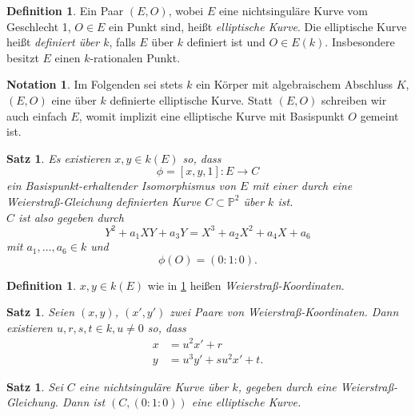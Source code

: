 \documentclass{amsart}
\theoremstyle{plain}
\newtheorem{proposition}[subsection]{Satz}
\theoremstyle{definition}
\newtheorem{definition}[subsection]{Definition}
\newtheorem*{notation}{Notation}
\newcommand{\projspace}{\mathds{P}}
\begin{document}
\begin{definition}
	Ein Paar $(E, O)$, wobei $E$ eine nichtsinguläre Kurve vom Geschlecht 1, $O \in E$ ein Punkt sind, heißt {\it elliptische Kurve}.
	Die elliptische Kurve heißt {\it definiert über $k$}, falls $E$ über $k$ definiert ist und $O \in E(k)$. Insbesondere besitzt $E$ einen $k$-rationalen Punkt.
\end{definition}

\begin{notation}
	Im Folgenden sei stets $k$ ein Körper mit algebraischem Abschluss $K$, $(E, O)$ eine über $k$ definierte elliptische Kurve. 
	Statt $(E, O)$ schreiben wir auch einfach $E$, womit implizit eine elliptische Kurve mit Basispunkt $O$ gemeint ist.
\end{notation}

\begin{proposition}
	\label{prop-existenz-weierstrass-koordinaten}
	Es existieren $x, y \in k(E)$ so, dass
	\begin{equation*}
		\phi = [x, y, 1] : E \rightarrow C
	\end{equation*}
	ein Basispunkt-erhaltender Isomorphismus von $E$ mit einer durch eine Weierstraß-Gleichung definierten Kurve $C \subset \projspace^2$ über $k$ ist. \\
	$C$ ist also gegeben durch
	\begin{equation*}
		Y^2 + a_1 XY + a_3 Y = X^3 + a_2 X^2 + a_4 X + a_6
	\end{equation*}
	mit $a_1, \dots, a_6 \in k$ und
	\begin{equation*}
		\phi(O) = (0 : 1 : 0).
	\end{equation*}
\end{proposition}

\begin{definition}
	$x, y \in k(E)$ wie in \ref{prop-existenz-weierstrass-koordinaten} heißen {\it Weierstraß-Koordinaten}.
\end{definition}

\begin{proposition}
	Seien $(x, y)$, $(x', y')$ zwei Paare von Weierstraß-Koordinaten. Dann existieren $u, r, s, t \in k, u \neq 0$ so, dass
	\begin{align*}
		x &= u^2 x' + r \\
		y &= u^3 y' + s u^2 x' + t.
	\end{align*}
\end{proposition}

\begin{proposition}
	Sei $C$ eine nichtsinguläre Kurve über $k$, gegeben durch eine Weierstraß-Gleichung. Dann ist $(C, (0 : 1 : 0))$ eine elliptische Kurve.
\end{proposition}
\end{document}
